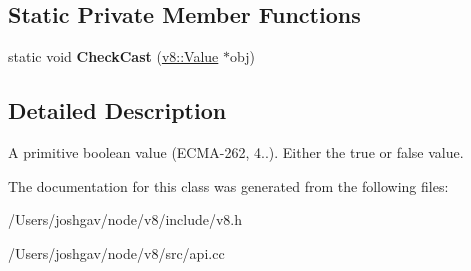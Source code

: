 \subsection*{Static Private Member Functions}
\begin{DoxyCompactItemize}
\item 
static void {\bfseries Check\+Cast} (\hyperlink{classv8_1_1_value}{v8\+::\+Value} $\ast$obj)\hypertarget{classv8_1_1_boolean_a69aba82e65461d38ecabbade35bfd6a8}{}\label{classv8_1_1_boolean_a69aba82e65461d38ecabbade35bfd6a8}

\end{DoxyCompactItemize}


\subsection{Detailed Description}
A primitive boolean value (E\+C\+M\+A-\/262, 4..). Either the true or false value. 

The documentation for this class was generated from the following files\+:\begin{DoxyCompactItemize}
\item 
/\+Users/joshgav/node/v8/include/v8.\+h\item 
/\+Users/joshgav/node/v8/src/api.\+cc\end{DoxyCompactItemize}
